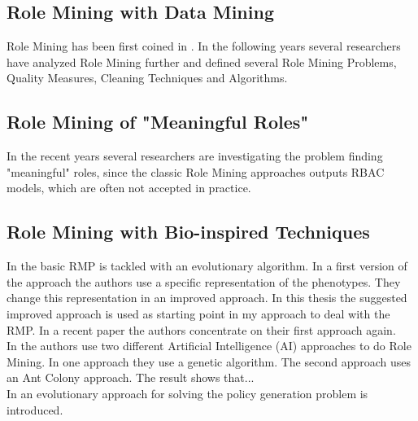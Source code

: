 \subsection{Role Mining with Data Mining}
Role Mining has been first coined in \cite{Kuhlmann}. In the following years several researchers have analyzed Role Mining further and defined several Role Mining Problems, Quality Measures, Cleaning Techniques and Algorithms.
\subsection{Role Mining of "Meaningful Roles"}
In the recent years several researchers are investigating the problem finding "meaningful" roles, since the classic Role Mining approaches outputs RBAC models, which are often not accepted in practice.
\subsection{Role Mining with Bio-inspired Techniques}
In \cite{Igor} the basic RMP is tackled with an evolutionary algorithm. In a first version of the approach the authors use a specific representation of the phenotypes. They change this representation in an improved approach. In this thesis the suggested improved approach is used as starting point in my approach to deal with the RMP. In a recent paper \cite{Igor2} the authors concentrate on their first approach again.\\
In \cite{DuChang} the authors use two different Artificial Intelligence (AI) approaches to do Role Mining. In one approach they use a genetic algorithm. The second approach uses an Ant Colony approach. The result shows that...\\
In \cite{paper} an evolutionary approach for solving the policy generation problem is introduced.